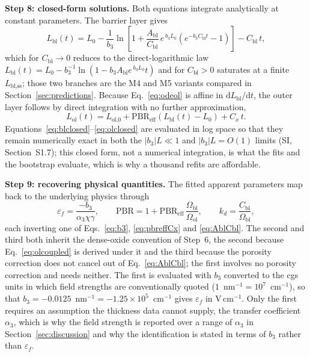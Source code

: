 \documentclass[pdflatex,sn-nature]{sn-jnl}
\begin{document}
\textbf{Step 8: closed-form solutions.} Both equations integrate
analytically at constant parameters. The barrier layer gives
\begin{equation}
L_\text{bl}(t) = L_0 - \frac{1}{b_3}
\ln\!\left[1 + \frac{A_\text{bl}}{C_\text{bl}}\, e^{\,b_3 L_0}
\left(e^{-b_3 C_\text{bl} t} - 1\right)\right] - C_\text{bl}\, t ,
\label{eq:blclosed}
\end{equation}
which for $C_\text{bl}\to0$ reduces to the direct-logarithmic law
$L_\text{bl}(t) = L_0 - b_3^{-1}\ln(1 - b_3 A_\text{bl} e^{\,b_3 L_0} t)$
and for $C_\text{bl}>0$ saturates at a finite
$L_\text{bl,ss}$; those two branches are the M4 and M5 variants compared
in Section~\ref{sec:predictions}. Because
Eq.~\eqref{eq:odeol} is affine in
$\mathrm{d}L_\text{bl}/\mathrm{d}t$, the outer layer follows by direct
integration with no further approximation,
\begin{equation}
L_\text{ol}(t) = L_\text{ol,0}
+ \mathrm{PBR}_\text{eff}\left(L_\text{bl}(t) - L_0\right) + C_x\, t .
\label{eq:olclosed}
\end{equation}
Equations~\eqref{eq:blclosed}--\eqref{eq:olclosed} are evaluated in log
space so that they remain numerically exact in both the
$|b_3|L\ll1$ and $|b_3|L=O(1)$ limits (SI, Section~S1.7); this
closed form, not a numerical integration, is what the fits and the
bootstrap evaluate, which is why a thousand refits are affordable.

\textbf{Step 9: recovering physical quantities.} The fitted apparent
parameters map back to the underlying physics through
\begin{equation}
\varepsilon_f = \frac{-b_3}{\alpha_3 \chi \gamma},
\qquad
\mathrm{PBR} = 1 + \mathrm{PBR}_\text{eff}\,
\frac{\Omega_\text{bl}}{\Omega_\text{ol}},
\qquad
k_d = \frac{C_\text{bl}}{\Omega_\text{bl}} ,
\label{eq:recover}
\end{equation}
each inverting one of Eqs.~\eqref{eq:b3}, \eqref{eq:pbreffCx} and \eqref{eq:AblCbl}. The second and third both inherit the dense-oxide convention of Step~6, the second because Eq.~\eqref{eq:olcoupled} is derived under it and the third because the porosity correction does not cancel out of Eq.~\eqref{eq:AblCbl}; the first involves no porosity correction and needs neither. The
first is evaluated with $b_3$ converted to the cgs units in which field
strengths are conventionally quoted
($1$~nm$^{-1} = 10^{7}$~cm$^{-1}$), so that
$b_3 = -0.0125$~nm$^{-1} = -1.25\times10^{5}$~cm$^{-1}$ gives
$\varepsilon_f$ in V\,cm$^{-1}$. Only the first requires an assumption
the thickness data cannot supply, the transfer coefficient $\alpha_3$, which is why
the field strength is reported over a range of $\alpha_3$ in
Section~\ref{sec:discussion} and why the identification is stated in terms of
$b_3$ rather than $\varepsilon_f$.
\end{document}

